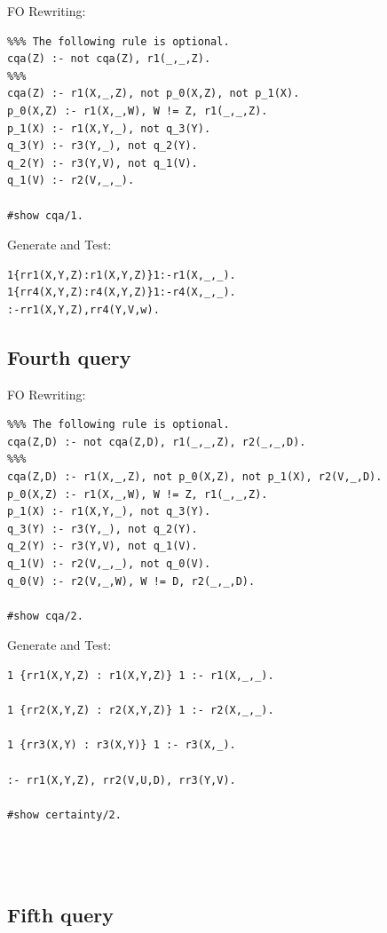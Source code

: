 \documentclass[acmsmall]{acmart}
\begin{document}
\begin{CCSXML}
FO Rewriting:
\begin{lstlisting}
%%% The following rule is optional.
cqa(Z) :- not cqa(Z), r1(_,_,Z).
%%%
cqa(Z) :- r1(X,_,Z), not p_0(X,Z), not p_1(X).
p_0(X,Z) :- r1(X,_,W), W != Z, r1(_,_,Z).
p_1(X) :- r1(X,Y,_), not q_3(Y).
q_3(Y) :- r3(Y,_), not q_2(Y).
q_2(Y) :- r3(Y,V), not q_1(V).
q_1(V) :- r2(V,_,_).

#show cqa/1.

\end{lstlisting}

Generate and Test:
\begin{lstlisting}
1{rr1(X,Y,Z):r1(X,Y,Z)}1:-r1(X,_,_).
1{rr4(X,Y,Z):r4(X,Y,Z)}1:-r4(X,_,_).
:-rr1(X,Y,Z),rr4(Y,V,w).

\end{lstlisting}


\subsection{Fourth query}

FO Rewriting:
\begin{lstlisting}
%%% The following rule is optional.
cqa(Z,D) :- not cqa(Z,D), r1(_,_,Z), r2(_,_,D).
%%%
cqa(Z,D) :- r1(X,_,Z), not p_0(X,Z), not p_1(X), r2(V,_,D).
p_0(X,Z) :- r1(X,_,W), W != Z, r1(_,_,Z).
p_1(X) :- r1(X,Y,_), not q_3(Y).
q_3(Y) :- r3(Y,_), not q_2(Y).
q_2(Y) :- r3(Y,V), not q_1(V).
q_1(V) :- r2(V,_,_), not q_0(V).
q_0(V) :- r2(V,_,W), W != D, r2(_,_,D).

#show cqa/2.

\end{lstlisting}

Generate and Test:
\begin{lstlisting}
1 {rr1(X,Y,Z) : r1(X,Y,Z)} 1 :- r1(X,_,_).

1 {rr2(X,Y,Z) : r2(X,Y,Z)} 1 :- r2(X,_,_).

1 {rr3(X,Y) : r3(X,Y)} 1 :- r3(X,_).

:- rr1(X,Y,Z), rr2(V,U,D), rr3(Y,V).

#show certainty/2.




\end{lstlisting}



\subsection{Fifth query}


\end{CCSXML}
\end{document}
